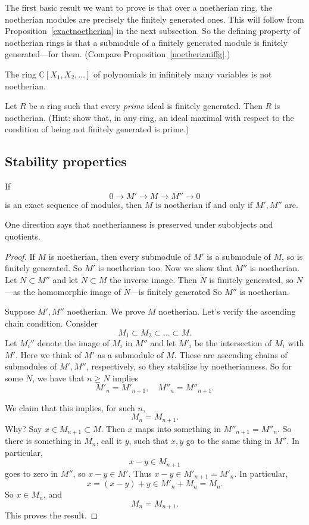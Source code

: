 The first basic result we want to prove is that over a noetherian ring, the
noetherian modules are precisely the finitely generated ones.  This will
follow from Proposition~\ref{exactnoetherian} in the next subsection. So the defining 
property of noetherian rings is that a submodule of a finitely generated
module is finitely generated---for them. (Compare
Proposition~\ref{noetherianiffg}.)

\begin{exercise} 
The ring $\mathbb{C}[X_1, X_2, \dots]$ of polynomials in infinitely many
variables is not noetherian.
\end{exercise} 

\begin{exercise} 
Let $R$ be a ring such that every \emph{prime} ideal is finitely generated.
Then $R$ is noetherian. (Hint: show that, in any ring, an ideal maximal with respect to the
condition of being not finitely generated is prime.)
\end{exercise} 

\subsection{Stability properties}
\begin{proposition} \label{exactnoetherian}
If 
\[ 0 \to M' \to  M \to M'' \to 0  \]
is an exact sequence of modules, then $M$ is noetherian if and only if $M',
M''$ are.
\end{proposition} 

One direction says that noetherianness is preserved under subobjects and
quotients.
\begin{proof} 
If $M$ is noetherian, then every submodule of $M'$ is a submodule of $M$, so is
finitely generated. So $M'$ is noetherian too. Now we show that $M''$ is
noetherian. Let $N \subset M''$ and let
$\widetilde{N} \subset M$ the inverse image. Then $\widetilde{N}$ is finitely generated, so
$N$---as the homomorphic image of $\widetilde{N}$---is finitely generated 
So $M''$ is noetherian.

Suppose $M', M''$ noetherian. We prove $M$ noetherian.
Let's verify the ascending chain condition. Consider
\[ M_1 \subset M_2 \subset \dots \subset M.  \]
Let $M_i''$ denote the image of $M_i$ in $M''$ and let $M'_i$ be the
intersection of $M_i$ with $M'$. Here we think of $M'$ as a submodule of $M$.
These are ascending chains of submodules of $M', M''$, respectively, so they
stabilize by noetherianness.
So for some $N$, we have
that $n \geq N$ implies 
\[ M'_n = M'_{n+1}, \quad M''_n = M''_{n+1}.  \]

We claim that this implies, for such $n$, 
\[ M_n = M_{n+1}.  \]
Why? Say $x \in M_{n+1} \subset M$. Then $x$ maps into something in $M''_{n+1} = M''_n$.  
So there is something in $M_n$, call it $y$, such that $x,y$ go to the same
thing in $M''$. In particular, 
\[ x - y \in M_{n+1} \]
goes to zero in $M''$, so $x-y \in M'$. Thus $x-y \in M'_{n+1} = M'_n$. In
particular, 
\[ x = (x-y) + y \in M'_n + M_n = M_n.  \]
So $x \in M_n$, and 
\[ M_n = M_{n+1} . \]
This proves the result.
\end{proof} 

